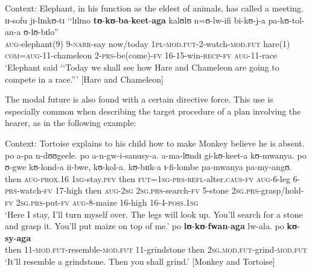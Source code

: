 \begin{exe}
\ex \label{exCommissiveHareChameleon}
Context: Elephant, in his function as the eldest of animals, has called a meeting.\\
\gll ɪɪ-sofu jɪ-lɪnkʊ-tɪ \lq\lq lɪlɪno \textbf{tʊ}-\textbf{kʊ}-\textbf{ba}-\textbf{keet}-\textbf{aga} kalʊlʊ n=ʊ-lw-ifi bi-kʊ-j-a pa-kʊ-tol-an-a ʊ-lʊ-bɪlo''\\
\textsc{aug}-elephant(9) 9-\textsc{narr}-say \phantom{\lq\lq}now/today \textsc{1pl}-\textsc{mod.fut}-2-watch-\textsc{mod.fut} hare(1) \textsc{com}=\textsc{aug}-11-chameleon 2-\textsc{prs}-be(come)-\textsc{fv} 16-15-win-\textsc{recp}-\textsc{fv} \textsc{aug}-11-race\\
\glt \lq Elephant said \textup{\lq\lq}Today we shall see how Hare and Chameleon are going to compete in a race.\textup{''}' [Hare and Chameleon]
\end{exe}

The modal future is also found with a certain directive force. This use is especially common when describing the target procedure of a plan involving the hearer, as in the following example:

\begin{exe}
\ex
Context: Tortoise explains to his child how to make Monkey believe he is absent.\\
\gll po a-pa n-dʊʊgeele. po a-n-gw-i-sanusy-a. a-ma-lʊndɪ gi-kʊ-keet-a kʊ-mwanya. po ʊ-gwe kʊ-lond-a ii-bwe, kʊ-kol-a. kʊ-bɪɪk-a ɪ-fi-lombe pa-mwanya pa-my-angʊ.\\
then \textsc{aug}-\textsc{prox.16} \textsc{1sg}-stay.\textsc{pfv} then \textsc{fut}=\textsc{1sg}-\textsc{prs}-\textsc{refl}-alter.\textsc{caus}-\textsc{fv} \textsc{aug}-6-leg 6-\textsc{prs}-watch-\textsc{fv} 17-high then \textsc{aug}-\textsc{2sg} \textsc{2sg.prs}-search-\textsc{fv} 5-stone \textsc{2sg.prs}-grasp/hold-\textsc{fv} \textsc{2sg.prs}-put-\textsc{fv} \textsc{aug}-8-maize 16-high 16-4-\textsc{poss.1sg}\\
\glt \lq Here I stay, I'll turn myself over. The legs will look up. ‎‎You'll search for a stone and grasp it. You'll put maize on top of me.'
\sn \gll po \textbf{lʊ}-\textbf{kʊ}-\textbf{fwan}-\textbf{aga} lw-ala. po \textbf{kʊ}-\textbf{sy}-\textbf{aga}\\
 then 11-\textsc{mod.fut}-resemble-\textsc{mod.fut} 11-grindstone then \textsc{2sg.mod.fut}-grind-\textsc{mod.fut}\\
\glt \lq It'll resemble a grindstone. Then you shall grind.' [Monkey and Tortoise]
\end{exe}

